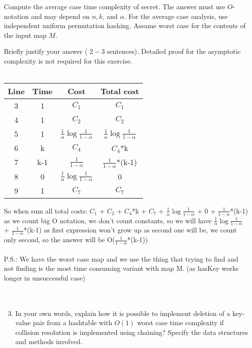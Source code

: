\documentclass[10pt]{article}
\begin{document}
Compute the average case time complexity of secret. The answer must use $O$-notation and may depend on $n, k$, and $\alpha$. For the average case analysis, use independent uniform permutation hashing. Assume worst case for the contents of the input map $M$.

Briefly justify your answer ( $2-3$ sentences). Detailed proof for the asymptotic complexity is not required for this exercise.\\
\\
\begin{center}
\begin{tabular}{|c|c|c|c|}
\hline
Line & Time & Cost & Total cost  \\
\hline
3 & 1 & $C_1$ &$C_1$ \\
\hline
4 & 1 &$C_2$ &$C_2$ \\
\hline
5 & 1 & $\frac{1}{\alpha}\log{\frac{1}{1-\alpha}}$& $\frac{1}{\alpha}\log{\frac{1}{1-\alpha}}$\\
\hline
6 & k &$C_4$ & $C_4$*k\\
\hline
7 & k-1 & $\frac{1}{1-\alpha}$&$\frac{1}{1-\alpha}$*(k-1) \\
\hline
8 &0  &$\frac{1}{\alpha}\log{\frac{1}{1-\alpha}}$ &0 \\
\hline
9 & 1 &$C_7$ &$C_7$ \\
\hline
\end{tabular}
\end{center}
So when sum all total costs: $C_1$ + $C_2$ + $C_4$*k + $C_7$ + $\frac{1}{\alpha}\log{\frac{1}{1-\alpha}}$ + 0 + $\frac{1}{1-\alpha}$*(k-1) as we count big O notation, we don't count constants, so we will have $\frac{1}{\alpha}\log{\frac{1}{1-\alpha}}$ + $\frac{1}{1-\alpha}$*(k-1) as first expression won't grow up as second one will be, we count only second, so the answer will be O($\frac{1}{1-\alpha}$*(k-1))\\
\\
P.S.: We have the worst case map and we use the thing that trying to find and not finding is the most time consuming variant with map M. (as hasKey works longer in unsuccessful case)
\\
\\
\\
\begin{enumerate}
  \setcounter{enumi}{2}
  \item In your own words, explain how it is possible to implement deletion of a key-value pair from a hashtable with $O(1)$ worst case time complexity if collision resolution is implemented using chaining? Specify the data structures and methods involved.
\end{enumerate}
\end{document}
